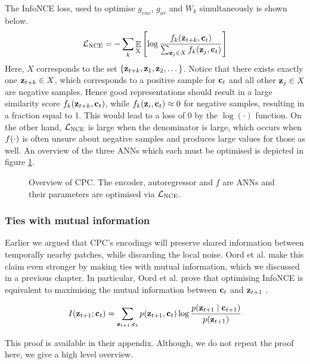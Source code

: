 	The InfoNCE loss, used to optimise $g_{enc}$, $g_{ar}$ and $W_k$ simultaneously is shown below. 
	\begin{equation} %
		\Lnce = - \sum_{k} \expected{\textsubscript{X}} \left[ \log \nceprediction \right] \label{eq:NCE_loss}
	\end{equation}
	Here, $X$ corresponds to the set ${ \left\{ \mathbf{z}_{t+k}, \mathbf{z}_1, \mathbf{z}_2, \dots \right\} }$. Notice that there exists exactly one $\mathbf{z}_{t+k} \in X$, which corresponds to a positive sample for $\mathbf{c}_t$ and all other $\mathbf{z}_j \in X$ are negative samples.  Hence good representations should result in a large similarity score $f_k(\mathbf{z}_{t+k}, \mathbf{c}_t)$, while $f_k(\mathbf{z}_i, \mathbf{c}_t) \approx 0$ for negative samples, resulting in a fraction equal to 1. This would lead to a loss of 0 by the $\log(\cdot)$ function. On the other hand, $\mathcal{L}_{\text{NCE}}$ is large when the denominator is large, which occurs when $f(\cdot)$ is often unsure about negative samples and produces large values for those as well. An overview of the three ANNs which each must be optimised is depicted in figure \ref{fig:cpc-my-overview}.
	

	\begin{figure}
		\hspace{2cm}
		\centering
		

		\caption{Overview of CPC. The encoder, autoregressor and $f$ are ANNs and their parameters are optimised via $\mathcal{L}_{\text{NCE}}$.}
		\label{fig:cpc-my-overview}
	\end{figure}
	
	
\subsubsection{Ties with mutual information} \label{cha:bg_cpc_ties_w_mi}
	Earlier we argued that CPC's encodings will preserve shared information between temporally nearby patches, while discarding the local noise. Oord et al. make this claim even stronger by making ties with mutual information, which we discussed in a previous chapter. In particular, Oord et al. prove that optimising InfoNCE is equivalent to maximising the mutual information between $\mathbf{c}_t$ and $\mathbf{z}_{t+1}$ \citep{oordRepresentationLearningContrastive2019}. 
	
	\begin{equation} %
		I(\ztone; \ct) = \sum_{\ztone, \ct} p(\ztone, \ct) \log \frac{p(\ztone \mid \ctone)}{p(\ztone)}
	\end{equation}
	
	This proof is available in their appendix. Although, we do not repeat the proof here, we give a high level overview.
	
